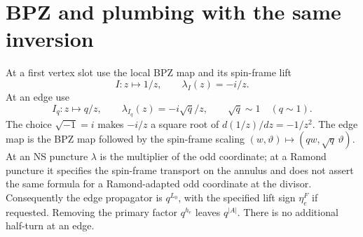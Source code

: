 \section*{BPZ and plumbing with the same inversion}

At a first vertex slot use the local BPZ map and its spin-frame lift
\begin{equation}
 I:z\longmapsto1/z,\qquad \lambda_I(z)=-i/z.
 \label{eq:new-bpz-map}
\end{equation}
At an edge use
\begin{equation}
 I_q:z\longmapsto q/z,\qquad \lambda_{I_q}(z)=-i\sqrt q/z,
 \qquad \sqrt q\sim1\quad(q\sim1).
 \label{eq:new-edge-map}
\end{equation}
The choice $\sqrt{-1}=i$ makes $-i/z$ a square root of
$d(1/z)/dz=-1/z^2$.  The edge map is the BPZ map followed by the
spin-frame scaling $(w,\vartheta)\mapsto(qw,\sqrt q\,\vartheta)$.
At an NS puncture $\lambda$ is the multiplier of the odd coordinate;
at a Ramond puncture it specifies the spin-frame transport on the
annulus and does not assert the same formula for a Ramond-adapted odd
coordinate at the divisor.
Consequently the edge propagator is $q^{L_0}$, with the specified lift
sign $\eta_e^{F}$ if requested.  Removing the primary factor $q^{h_e}$
leaves $q^{|A|}$.  There is no additional half-turn at an edge.

